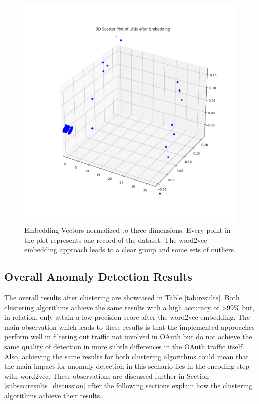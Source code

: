 \begin{figure}[H]
	\sffamily\footnotesize
	\includegraphics[width=1\textwidth]{pic/word_embeddings_3d.png}
	\unitlength=0.75mm
	\linethickness{0.4pt}
	\caption{Embedding Vectors normalized to three dimensions. Every point in the plot represents one record of the dataset. The word2vec embedding approach leads to a clear group and some sets of outliers.}
	\label{fig:word_embeddings3D}
\end{figure}

\subsection{Overall Anomaly Detection Results}
The overall results after clustering are showcased in Table \ref{tab:results}. Both clustering algorithms achieve the same results with a high accuracy of >99\% but, in relation, only attain a low precision score after the word2vec embedding. The main observation which leads to these results is that the implemented approaches perform well in filtering out traffic not involved in OAuth but do not achieve the same quality of detection in more subtle differences in the OAuth traffic itself. Also, achieving the same results for both clustering algorithms could mean that the main impact for anomaly detection in this scenario lies in the encoding step with word2vec. These observations are discussed further in Section \ref{subsec:results_discussion} after the following sections explain how the clustering algorithms achieve their results.

